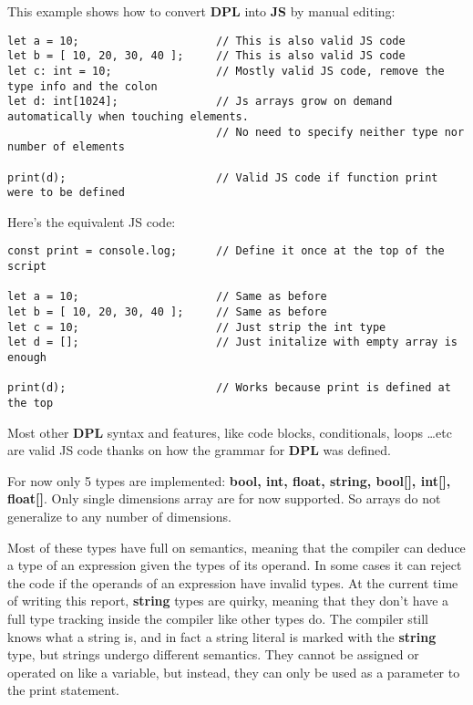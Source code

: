 \documentclass[a4paper]{article}
\begin{document}
This example shows how to convert \textbf{DPL} into \textbf{JS} by manual editing:

\begin{lstlisting}[language=DPL]
let a = 10;                     // This is also valid JS code
let b = [ 10, 20, 30, 40 ];     // This is also valid JS code
let c: int = 10;                // Mostly valid JS code, remove the type info and the colon
let d: int[1024];               // Js arrays grow on demand automatically when touching elements.
                                // No need to specify neither type nor number of elements

print(d);                       // Valid JS code if function print were to be defined
\end{lstlisting}

Here's the equivalent JS code:

\begin{lstlisting}[language=JS]
const print = console.log;      // Define it once at the top of the script

let a = 10;                     // Same as before
let b = [ 10, 20, 30, 40 ];     // Same as before
let c = 10;                     // Just strip the int type
let d = [];                     // Just initalize with empty array is enough

print(d);                       // Works because print is defined at the top
\end{lstlisting}

Most other \textbf{DPL} syntax and features, like code blocks, conditionals, loops \dots etc are valid JS code
thanks on how the grammar for \textbf{DPL} was defined.

For now only 5 types are implemented: \textbf{bool, int, float, string, bool[], int[], float[]}.
Only single dimensions array are for now supported. So arrays do not generalize to any number of dimensions.

Most of these types have full on semantics, meaning that the compiler can deduce
a type of an expression given the types of its operand. In some cases it can reject
the code if the operands of an expression have invalid types.
At the current time of writing this report, \textbf{string} types are quirky, meaning that
they don't have a full type tracking inside
the compiler like other types do.
The compiler still knows what a string is, and in fact a string literal is marked
with the \textbf{string} type, but strings undergo different semantics.
They cannot be assigned or operated on like a variable, but instead,
they can only be used as a parameter to the print statement.
\end{document}
